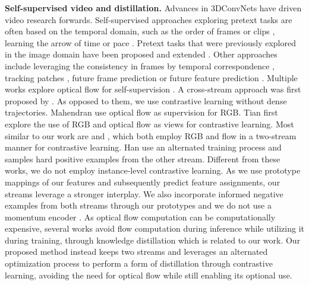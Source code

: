 \documentclass[10pt,twocolumn,letterpaper]{article}
\begin{document}
\textbf{Self-supervised video and distillation.} Advances in 3DConvNets \cite{tran_learning_2015, hara_can_2018, tran_closer_2018} have driven video research forwards. Self-supervised approaches exploring pretext tasks are often based on the temporal domain, such as the order of frames or clips \cite{misra_shuffle_2016, fernando_self-supervised_2017, lee_unsupervised_2017, xu_self-supervised_2019}, learning the arrow of time \cite{pickup_seeing_2014, wei_learning_2018} or pace \cite{yao_video_2020,  cho_self-supervised_2020, wang_self-supervised_2020, benaim_speednet_2020}. Pretext tasks that were previously explored in the image domain have been proposed and extended \cite{jing_self-supervised_2019, kim_self-supervised_2019}. Other approaches include leveraging the consistency in frames by temporal correspondence \cite{lai_mast_2020, lai_self-supervised_2019}, tracking patches \cite{wang_unsupervised_2015, wang_learning_2019}, future frame prediction \cite{goroshin_unsupervised_2015, vondrick_generating_2016} or future feature prediction \cite{han_video_2019, han_memory-augmented_2020}. Multiple works explore optical flow for self-supervision \cite{han_memory-augmented_2020, han_self-supervised_2020, mahendran_cross_2018}. A cross-stream approach was first proposed by \cite{ohnishi_improved_2016}. As opposed to them, we use contrastive learning without dense trajectories. Mahendran \etal \cite{mahendran_cross_2018} use optical flow as supervision for RGB. Tian \etal \cite{tian_contrastive_2020} first explore the use of RGB and optical flow as views for contrastive learning. Most similar to our work are \cite{tian_contrastive_2020} and \cite{han_self-supervised_2020}, which both employ RGB and flow in a two-stream manner for contrastive learning. Han \etal \cite{han_self-supervised_2020} use an alternated training process and samples hard positive examples from the other stream. Different from these works, we do not employ instance-level contrastive learning. As we use prototype mappings of our features and subsequently predict feature assignments, our streams leverage a stronger interplay. We also incorporate informed negative examples from both streams through our prototypes and we do not use a momentum encoder \cite{he_momentum_2020}. As optical flow computation can be computationally expensive, several works avoid flow computation during inference while utilizing it during training, \eg through knowledge distillation \cite{stroud_d3d_2020, crasto_mars_2019, zhao_dance_2019, gavrilyuk_motion-augmented_2021} which is related to our work. Our proposed method instead keeps two streams and leverages an alternated optimization process to perform a form of distillation through contrastive learning, avoiding the need for optical flow while still enabling its optional use. 
\end{document}
